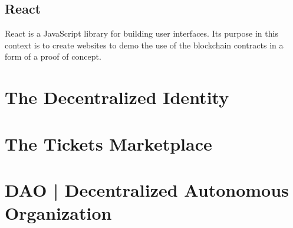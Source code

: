 \subsection{React}
React is a JavaScript library for building user interfaces. Its purpose in this context is to create websites to demo the use of the blockchain contracts in a form of a proof of concept.
 




\section{The Decentralized Identity}

\section{The Tickets Marketplace}

\section{DAO | Decentralized Autonomous Organization}